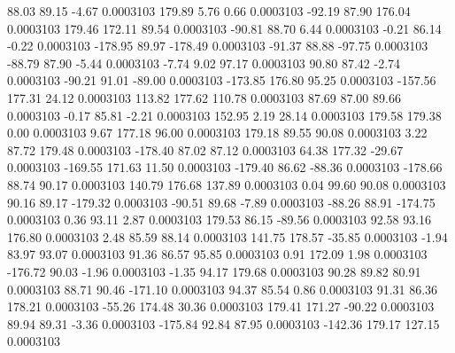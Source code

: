        88.03       89.15       -4.67     0.0003103
      179.89        5.76        0.66     0.0003103
      -92.19       87.90      176.04     0.0003103
      179.46      172.11       89.54     0.0003103
      -90.81       88.70        6.44     0.0003103
       -0.21       86.14       -0.22     0.0003103
     -178.95       89.97     -178.49     0.0003103
      -91.37       88.88      -97.75     0.0003103
      -88.79       87.90       -5.44     0.0003103
       -7.74        9.02       97.17     0.0003103
       90.80       87.42       -2.74     0.0003103
      -90.21       91.01      -89.00     0.0003103
     -173.85      176.80       95.25     0.0003103
     -157.56      177.31       24.12     0.0003103
      113.82      177.62      110.78     0.0003103
       87.69       87.00       89.66     0.0003103
       -0.17       85.81       -2.21     0.0003103
      152.95        2.19       28.14     0.0003103
      179.58      179.38        0.00     0.0003103
        9.67      177.18       96.00     0.0003103
      179.18       89.55       90.08     0.0003103
        3.22       87.72      179.48     0.0003103
     -178.40       87.02       87.12     0.0003103
       64.38      177.32      -29.67     0.0003103
     -169.55      171.63       11.50     0.0003103
     -179.40       86.62      -88.36     0.0003103
     -178.66       88.74       90.17     0.0003103
      140.79      176.68      137.89     0.0003103
        0.04       99.60       90.08     0.0003103
       90.16       89.17     -179.32     0.0003103
      -90.51       89.68       -7.89     0.0003103
      -88.26       88.91     -174.75     0.0003103
        0.36       93.11        2.87     0.0003103
      179.53       86.15      -89.56     0.0003103
       92.58       93.16      176.80     0.0003103
        2.48       85.59       88.14     0.0003103
      141.75      178.57      -35.85     0.0003103
       -1.94       83.97       93.07     0.0003103
       91.36       86.57       95.85     0.0003103
        0.91      172.09        1.98     0.0003103
     -176.72       90.03       -1.96     0.0003103
       -1.35       94.17      179.68     0.0003103
       90.28       89.82       80.91     0.0003103
       88.71       90.46     -171.10     0.0003103
       94.37       85.54        0.86     0.0003103
       91.31       86.36      178.21     0.0003103
      -55.26      174.48       30.36     0.0003103
      179.41      171.27      -90.22     0.0003103
       89.94       89.31       -3.36     0.0003103
     -175.84       92.84       87.95     0.0003103
     -142.36      179.17      127.15     0.0003103
